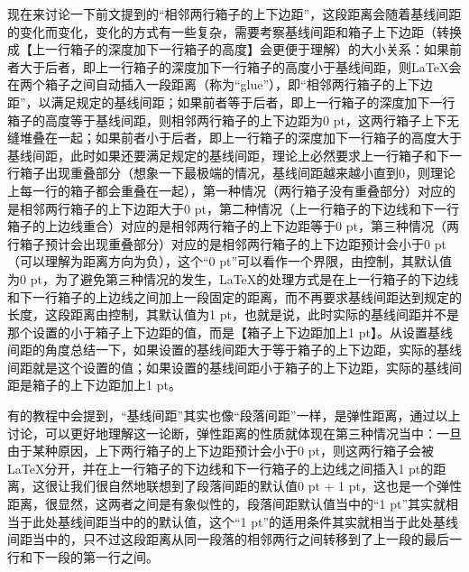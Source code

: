 \documentclass{article}
\newcommand{\mnt}[1]{\texttt{#1}} %
\begin{document}
{\begin{enumerate}
        现在来讨论一下前文提到的“相邻两行箱子的上下边距”，这段距离会随着基线间距的变化而变化，变化的方式有一些复杂，需要考察基线间距和箱子上下边距（转换成【上一行箱子的深度加下一行箱子的高度】会更便于理解）的大小关系：如果前者大于后者，即上一行箱子的深度加下一行箱子的高度小于基线间距，则\LaTeX{}会在两个箱子之间自动插入一段距离（称为“glue”），即“相邻两行箱子的上下边距”，以满足规定的基线间距；如果前者等于后者，即上一行箱子的深度加下一行箱子的高度等于基线间距，则相邻两行箱子的上下边距为0 pt，这两行箱子上下无缝堆叠在一起；如果前者小于后者，即上一行箱子的深度加下一行箱子的高度大于基线间距，此时如果还要满足规定的基线间距，理论上必然要求上一行箱子和下一行箱子出现重叠部分（想象一下最极端的情况，基线间距越来越小直到0，则理论上每一行的箱子都会重叠在一起），第一种情况（两行箱子没有重叠部分）对应的是相邻两行箱子的上下边距大于0 pt，第二种情况（上一行箱子的下边线和下一行箱子的上边线重合）对应的是相邻两行箱子的上下边距等于0 pt，第三种情况（两行箱子预计会出现重叠部分）对应的是相邻两行箱子的上下边距预计会小于0 pt（可以理解为距离方向为负），这个“0 pt”可以看作一个界限，由\mnt{\lineskiplimit}控制，其默认值为0 pt，为了避免第三种情况的发生，\LaTeX{}的处理方式是在上一行箱子的下边线和下一行箱子的上边线之间加上一段固定的距离，而不再要求基线间距达到规定的长度，这段距离由\mnt{\lineskip}控制，其默认值为1 pt，也就是说，此时实际的基线间距并不是那个设置的小于箱子上下边距的值，而是【箱子上下边距加上1 pt】。从设置基线间距的角度总结一下，如果设置的基线间距大于等于箱子的上下边距，实际的基线间距就是这个设置的值；如果设置的基线间距小于箱子的上下边距，实际的基线间距是箱子的上下边距加上1 pt。

        有的教程中会提到，“基线间距”其实也像“段落间距”一样，是弹性距离，通过以上讨论，可以更好地理解这一论断，弹性距离的性质就体现在第三种情况当中：一旦由于某种原因，上下两行箱子的上下边距预计会小于0 pt，则这两行箱子会被\LaTeX{}分开，并在上一行箱子的下边线和下一行箱子的上边线之间插入1 pt的距离，这很让我们很自然地联想到了段落间距的默认值0 pt + 1 pt，这也是一个弹性距离，很显然，这两者之间是有象似性的，段落间距默认值当中的“1 pt”其实就相当于此处基线间距当中的\mnt{\lineskip}的默认值，这个“1 pt”的适用条件其实就相当于此处基线间距当中的\mnt{\lineskiplimit}，只不过这段距离从同一段落的相邻两行之间转移到了上一段的最后一行和下一段的第一行之间。
    \end{enumerate}
}%
\end{document}
